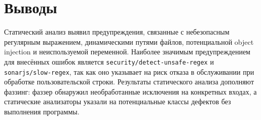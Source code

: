 \section{Выводы} \label{ch3:conclusion}

Статический анализ выявил предупреждения, связанные с небезопасным регулярным
выражением, динамическими путями файлов, потенциальной object injection и
неиспользуемой переменной. Наиболее значимым предупреждением для внесённых ошибок
является \texttt{security/detect-unsafe-regex} и \texttt{sonarjs/slow-regex}, так
как оно указывает на риск отказа в обслуживании при обработке пользовательской
строки. Результаты статического анализа дополняют фаззинг: фаззер обнаружил
необработанные исключения на конкретных входах, а статические анализаторы указали
на потенциальные классы дефектов без выполнения программы.
